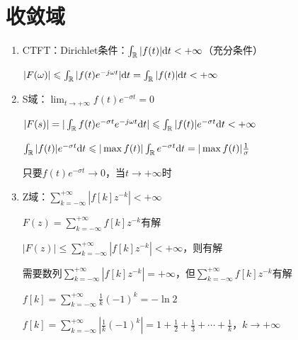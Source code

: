 \documentclass[UTF8]{ctexart}
\begin{document}
\section{收敛域}
\begin{enumerate}[label=(\arabic*),itemindent=0pt,labelindent=\parindent,labelwidth=2em,labelsep=5pt,leftmargin=*]
  \item CTFT：Dirichlet条件：$\int_{\mathbb{R}}|f(t)|{\rm{d}}t<+\infty$（充分条件）\par
        $|F(\omega)|\leqslant\int_{\mathbb{R}}|f(t)e^{-j\omega{t}}|{\rm{d}}t=\int_{\mathbb{R}}|f(t)|{\rm{d}}t<+\infty$
  \item S域：$\lim_{t\to +\infty}f(t)e^{-\sigma t}=0$ \par
        $|F(s)|=|\int_{\mathbb{R}}f(t)e^{-\sigma t}e^{-j\omega t}{\rm{d}}t|\leqslant\int_{\mathbb{R}}|f(t)|e^{-\sigma t}{\rm{d}}t<+\infty$ \par
        $\int_{\mathbb{R}}|f(t)|e^{-\sigma t}{\rm{d}}t\leqslant |\max{f(t)}|\int_{\mathbb{R}}e^{-\sigma t}{\rm{d}}t=|\max{f(t)}|\frac{1}{\sigma}$ \par
        只要$f(t)e^{-\sigma t}\to 0$，当$t\to +\infty$时
  \item Z域：$\sum_{k=-\infty}^{+\infty}|f[k]z^{-k}|<+\infty$ \par
        $F(z)=\sum_{k=-\infty}^{+\infty}f[k]z^{-k}$有解 \par
        $|F(z)|\leqslant\sum_{k=-\infty}^{+\infty}|f[k]z^{-k}|<+\infty$，则有解 \par
        需要数列$\sum_{k=-\infty}^{+\infty}|f[k]z^{-k}|=+\infty$，但$\sum_{k=-\infty}^{+\infty}f[k]z^{-k}$有解 \par
        $f[k]=\sum_{k=-\infty}^{+\infty}\frac{1}{k}(-1)^k=-\ln2$ \par
        $f[k]=\sum_{k=-\infty}^{+\infty}|\frac{1}{k}(-1)^k|=1+\frac{1}{2}+\frac{1}{3}+\cdots+\frac{1}{k}$，$k\to+\infty$
\end{enumerate}\par
\end{document}

